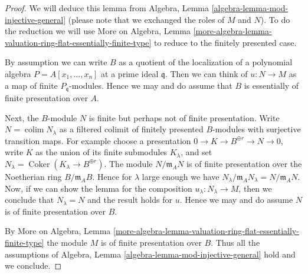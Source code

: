 \documentclass[10pt,a4paper]{amsart}
\theoremstyle{plain}
\theoremstyle{definition}
\theoremstyle{remark}
\numberwithin{equation}{subsection}
\def\colim{\mathop{\mathrm{colim}}\nolimits}
\def\Coker{\mathop{\mathrm{Coker}}}
\begin{document}
\begin{proof}
We will deduce this lemma from
Algebra, Lemma \ref{algebra-lemma-mod-injective-general}
(please note that we exchanged the roles of $M$ and $N$).
To do the reduction we will use More on Algebra, Lemma
\ref{more-algebra-lemma-valuation-ring-flat-essentially-finite-type}
to reduce to the finitely presented case.

\medskip\noindent
By assumption we can write $B$ as a quotient of the localization of
a polynomial algebra $P = A[x_1, \ldots, x_n]$ at a prime ideal
$\mathfrak q$. Then we can think of $u : N \to M$ as a map
of finite $P_\mathfrak q$-modules. Hence we may and do assume that
$B$ is essentially of finite presentation over $A$.

\medskip\noindent
Next, the $B$-module $N$ is finite but perhaps not of finite presentation.
Write $N = \colim N_\lambda$ as a filtered colimit of finitely presented
$B$-modules with surjective transition maps. For example choose
a presentation $0 \to K \to B^{\oplus r} \to N \to 0$,
write $K$ as the union of its finite submodules $K_\lambda$, and
set $N_\lambda = \Coker(K_\lambda \to B^{\oplus r})$.
The module $N/\mathfrak m_A N$ is of finite presentation
over the Noetherian ring $B/\mathfrak m_A B$.
Hence for $\lambda$ large enough we have
$N_\lambda/\mathfrak m_A N_\lambda = N/\mathfrak m_A N$.
Now, if we can show the lemma for the composition
$u_\lambda : N_\lambda \to M$, then we conclude that
$N_\lambda = N$ and the result holds for $u$.
Hence we may and do assume $N$ is of finite presentation over $B$.

\medskip\noindent
By More on Algebra, Lemma
\ref{more-algebra-lemma-valuation-ring-flat-essentially-finite-type}
the module $M$ is of finite presentation over $B$.
Thus all the assumptions of
Algebra, Lemma \ref{algebra-lemma-mod-injective-general}
hold and we conclude.
\end{proof}
\end{document}
